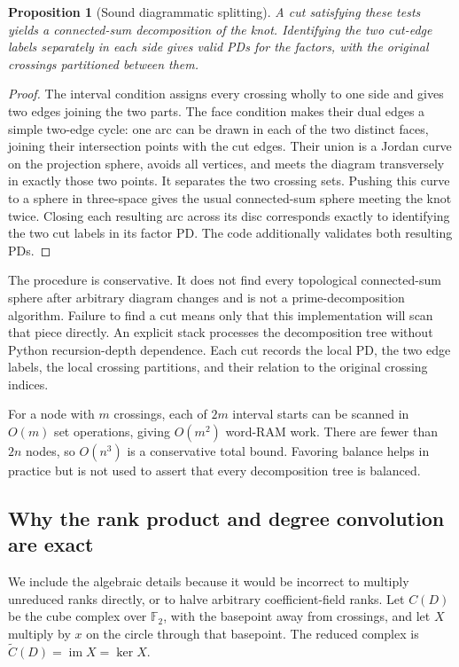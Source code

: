 \documentclass[11pt,letterpaper]{article}
\newtheorem{proposition}[theorem]{Proposition}
\theoremstyle{definition}\newtheorem{definition}[theorem]{Definition}
\theoremstyle{remark}\newtheorem{remark}[theorem]{Remark}
\newcommand{\F}{\mathbb F}
\begin{document}
\begin{proposition}[Sound diagrammatic splitting]
A cut satisfying these tests yields a connected-sum decomposition of the knot.
Identifying the two cut-edge labels separately in each side gives valid PDs for
the factors, with the original crossings partitioned between them.
\end{proposition}
\begin{proof}
The interval condition assigns every crossing wholly to one side and gives two
edges joining the two parts. The face condition makes their dual edges a simple
two-edge cycle: one arc can be drawn in each of the two distinct faces, joining
their intersection points with the cut edges. Their union is a Jordan curve on
the projection sphere, avoids all vertices, and meets the diagram transversely
in exactly those two points. It separates the two crossing sets. Pushing this
curve to a sphere in three-space gives the usual connected-sum sphere meeting
the knot twice. Closing each resulting arc across its disc corresponds exactly
to identifying the two cut labels in its factor PD. The code additionally
validates both resulting PDs.
\end{proof}

The procedure is conservative. It does not find every topological connected-sum
sphere after arbitrary diagram changes and is not a prime-decomposition
algorithm. Failure to find a cut means only that this implementation will scan
that piece directly. An explicit stack processes the decomposition tree without
Python recursion-depth dependence. Each cut records the local PD, the two edge
labels, the local crossing partitions, and their relation to the original
crossing indices.

For a node with $m$ crossings, each of $2m$ interval starts can be scanned in
$O(m)$ set operations, giving $O(m^2)$ word-RAM work. There are fewer than $2n$
nodes, so $O(n^3)$ is a conservative total bound. Favoring balance helps in
practice but is not used to assert that every decomposition tree is balanced.

\subsection{Why the rank product and degree convolution are exact}
\label{sec:splitting}

We include the algebraic details because it would be incorrect to multiply
unreduced ranks directly, or to halve arbitrary coefficient-field ranks.
Let $C(D)$ be the cube complex over $\F_2$, with the basepoint away from
crossings, and let $X$ multiply by $x$ on the circle through that basepoint.
The reduced complex is $\widetilde C(D)=\operatorname{im}X=\ker X$.
\end{document}
